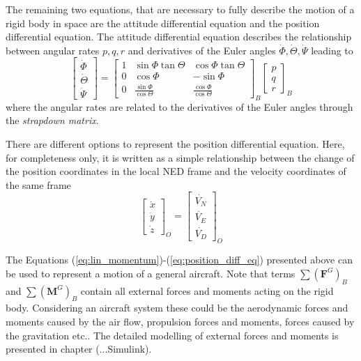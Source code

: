 \documentclass[11pt, a4paper, twoside]{report}
\begin{document}
The remaining two equations, that are necessary to fully describe the motion of a rigid body in space are the attitude differential equation and the position differential equation. The attitude differential equation describes the relationship between angular rates $p, q, r$ and derivatives of the Euler angles $\dot{\Phi}, \dot{\Theta}, \dot{\Psi}$ leading to
\begin{equation}
	\begin{bmatrix}
		\dot{\Phi}\\
		\dot{\Theta}\\
		\dot{\Psi}
	\end{bmatrix} =
	\begin{bmatrix}
    	1 & \sin\Phi\tan\Theta & \cos\Phi\tan\Theta \\
    	0 & \cos\Phi & -\sin\Phi \\
    	0 & \frac{\sin\Phi}{\cos\Theta} & \frac{\cos\Phi}{\cos\Theta}
    \end{bmatrix}_B
    \begin{bmatrix}
		p\\
		q\\
		r
	\end{bmatrix}_B
	\label{eq:attitude_diff_eq}
\end{equation}
where the angular rates are related to the derivatives of the Euler angles through the \textit{strapdown matrix}.

There are different options to represent the position differential equation. Here, for completeness only, it is written as a simple relationship between the change of the position coordinates in the local \acrshort{NED} frame and the velocity coordinates of the same frame
\begin{equation}
	\begin{bmatrix}
		\dot{x}\\
		\dot{y}\\
		\dot{z}
	\end{bmatrix}_O =
	\begin{bmatrix}
		\dot{V_N}\\
		\dot{V_E}\\
		\dot{V_D}
	\end{bmatrix}_O
	\label{eq:position_diff_eq}
\end{equation}

The Equations (\ref{eq:lin_momentum})-(\ref{eq:position_diff_eq}) presented above can be used to represent a motion of a general aircraft. Note that terms $\sum(\bm{F}^G)_B$ and $\sum (\bm{M}^G)_B$ contain all external forces and moments acting on the rigid body. Considering an aircraft system these could be the aerodynamic forces and moments caused by the air flow, propulsion forces and moments, forces caused by the gravitation etc.. The detailed modelling of external forces and moments is presented in chapter (...Simulink).
\end{document}
